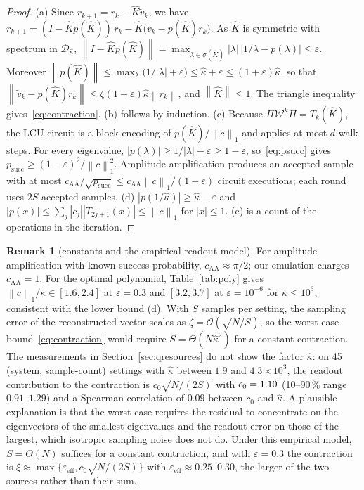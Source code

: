 \documentclass[11pt]{article}
\theoremstyle{definition}
\newtheorem{remark}[theorem]{Remark}
\newcommand{\norm}[1]{\left\lVert #1 \right\rVert}
\newcommand{\Kh}{\hat K}
\newcommand{\kh}{\hat\kappa}
\newcommand{\eps}{\varepsilon}
\newcommand{\bigO}{\mathcal{O}}
\begin{document}
\begin{proof}
(a) Since $r_{k+1}=r_k-\Kh\tilde v_k$, we have $r_{k+1}=(I-\Kh p(\Kh))\,r_k-\Kh\big(\tilde v_k-p(\Kh)r_k\big)$. As $\Kh$ is symmetric with spectrum in $\mathcal D_{\kh}$, $\norm{I-\Kh p(\Kh)}=\max_{\lambda\in\sigma(\Kh)}|\lambda|\,|1/\lambda-p(\lambda)|\le\eps$. Moreover $\norm{p(\Kh)}\le\max_{\lambda}\big(1/|\lambda|+\eps\big)\le\kh+\eps\le(1+\eps)\kh$, so that $\norm{\tilde v_k-p(\Kh)r_k}\le\zeta(1+\eps)\kh\norm{r_k}$, and $\norm{\Kh}\le1$. The triangle inequality gives~\eqref{eq:contraction}. (b) follows by induction. (c) Because $\Pi\mathcal W^{k}\Pi=T_k(\Kh)$, the LCU circuit is a block encoding of $p(\Kh)/\norm{c}_1$ and applies at most $d$ walk steps. For every eigenvalue, $|p(\lambda)|\ge1/|\lambda|-\eps\ge1-\eps$, so~\eqref{eq:psucc} gives $p_{\text{succ}}\ge(1-\eps)^2/\norm{c}_1^2$. Amplitude amplification produces an accepted sample with at most $c_{\text{AA}}/\sqrt{p_{\text{succ}}}\le c_{\text{AA}}\norm{c}_1/(1-\eps)$ circuit executions; each round uses $2S$ accepted samples. (d) $|p(1/\kh)|\ge\kh-\eps$ and $|p(x)|\le\sum_j|c_j||T_{2j+1}(x)|\le\norm{c}_1$ for $|x|\le1$. (e) is a count of the operations in the iteration.
\end{proof}

\begin{remark}[constants and the empirical readout model]\label{rem:readout}
For amplitude amplification with known success probability, $c_{\text{AA}}\approx\pi/2$; our emulation charges $c_{\text{AA}}=1$. For the optimal polynomial, Table~\ref{tab:poly} gives $\norm{c}_1/\kappa\in[1.6,2.4]$ at $\eps=0.3$ and $[3.2,3.7]$ at $\eps=10^{-6}$ for $\kappa\le10^{3}$, consistent with the lower bound (d). With $S$ samples per setting, the sampling error of the reconstructed vector scales as $\zeta=\bigO(\sqrt{N/S})$, so the worst-case bound~\eqref{eq:contraction} would require $S=\Theta(N\kh^{2})$ for a constant contraction. The measurements in Section~\ref{sec:qresources} do not show the factor $\kh$: on 45 (system, sample-count) settings with $\kh$ between $1.9$ and $4.3\times10^{3}$, the readout contribution to the contraction is $c_0\sqrt{N/(2S)}$ with $c_0=1.10$ (10--90\,\% range $0.91$--$1.29$) and a Spearman correlation of $0.09$ between $c_0$ and $\kh$. A plausible explanation is that the worst case requires the residual to concentrate on the eigenvectors of the smallest eigenvalues and the readout error on those of the largest, which isotropic sampling noise does not do. Under this empirical model, $S=\Theta(N)$ suffices for a constant contraction, and with $\eps=0.3$ the contraction is $\xi\approx\max\{\eps_{\text{eff}},c_0\sqrt{N/(2S)}\}$ with $\eps_{\text{eff}}\approx0.25$--$0.30$, the larger of the two sources rather than their sum.
\end{remark}
\end{document}
